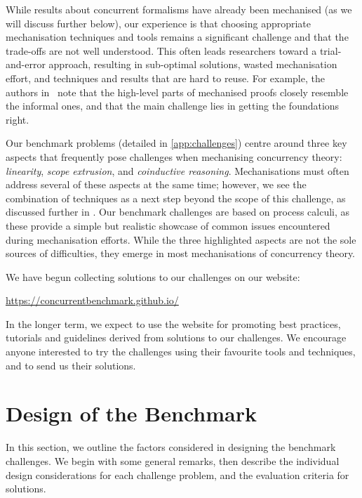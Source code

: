 \documentclass[runningheads]{llncs}
\begin{document}
While results about concurrent
formalisms have already been mechanised (as we will discuss further
below), our experience is that choosing appropriate mechanisation
techniques and tools remains a significant challenge and that the
trade-offs are not well understood.  This often leads researchers
toward a trial-and-error approach, resulting in sub-optimal solutions,
wasted mechanisation effort, and techniques and results that are hard
to reuse. For example, the authors in~\cite{Cruz-Filipe2021b} note that the high-level parts of
mechanised proofs closely resemble the informal ones, and that the
main challenge lies in getting the foundations right.

Our benchmark problems (detailed in \cref{app:challenges}) centre around three key aspects that frequently pose challenges when mechanising concurrency theory: \emph{linearity}, \emph{scope extrusion}, and \emph{coinductive reasoning}.
Mechanisations must often address several of these
aspects at the same time; however, we see the combination of
techniques as a next step beyond the scope of this challenge, as
discussed further in .
Our benchmark challenges are based on process calculi, as these provide a simple but
realistic showcase of common issues encountered during mechanisation efforts.
While the three highlighted aspects are not the sole sources of difficulties, they emerge in most mechanisations of concurrency theory.

We have begun collecting solutions to our challenges on our website:
%
\begin{center}
  \url{https://concurrentbenchmark.github.io/}
\end{center}
%
In the longer term, we expect to use the website for promoting best practices, tutorials and guidelines derived from solutions to our challenges.
We encourage anyone interested to try the challenges using their favourite tools and techniques, and to send us their solutions.

\section{Design of the Benchmark}\label{sec:design-discussion}
In this section, we outline the factors considered in designing the benchmark challenges.
We begin with some general remarks, then describe the individual design considerations for each challenge problem, and the evaluation criteria for solutions.
\end{document}
